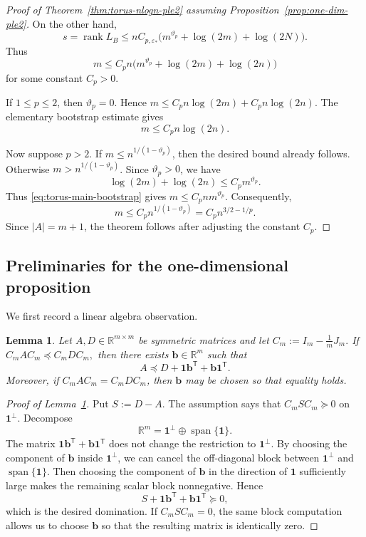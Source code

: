 \documentclass[11pt]{article}
\newtheorem{lemma}[theorem]{Lemma}
\theoremstyle{definition}
\newcommand{\R}{\mathbb R}
\begin{document}
\begin{proof}[Proof of Theorem~\ref{thm:torus-nlogn-ple2} assuming Proposition~\ref{prop:one-dim-ple2}]
On the other hand,
\[
s=\operatorname{rank}L_B
\le nC_{p,\varepsilon_*}\bigl(m^{\vartheta_p}+\log(2m)+\log(2N)\bigr).
\]
Thus
\begin{equation}\label{eq:torus-main-bootstrap}
m
\le
C_p n\bigl(m^{\vartheta_p}+\log(2m)+\log(2n)\bigr)
\end{equation}
for some constant \(C_{p}>0.\)

If \(1\le p\le2\), then \(\vartheta_p=0\). Hence
\(
m\le C_p n\log(2m)+C_p n\log(2n).
\)
The elementary bootstrap estimate
gives
\[
m\le C_p n\log(2n).
\]

Now suppose \(p>2\). If \(m\le n^{1/(1-\vartheta_p)}\), then the desired bound
already follows. Otherwise \(m>n^{1/(1-\vartheta_p)}\). Since \(\vartheta_p>0\),
we have
\[
\log(2m)+\log(2n)\le C_p m^{\vartheta_p}.
\]
Thus \eqref{eq:torus-main-bootstrap} gives
\(
m\le C_p n m^{\vartheta_p}.
\)
Consequently,
\[
m\le C_p n^{1/(1-\vartheta_p)}
=
C_p n^{3/2-1/p}.
\]
Since \(|A|=m+1\), the theorem follows after adjusting the constant \(C_p\).
\end{proof}

\subsection{Preliminaries for the one-dimensional proposition}



We first record a linear algebra observation.

\begin{lemma}\label{lem:centered-domination-to-domination}
Let \(A,D\in\R^{m\times m}\) be symmetric matrices and let
\(
C_m:=I_m-\frac1mJ_m.
\)
If
\(
C_mAC_m\preceq C_mDC_m,
\)
then there exists \(\boldsymbol{b}\in\R^m\) such that
\[
A\preceq D+\boldsymbol{1}\boldsymbol{b}^{\mathsf T}+\boldsymbol{b}\boldsymbol{1}^{\mathsf T}.
\]
Moreover, if \(C_mAC_m=C_mDC_m\), then \(\boldsymbol{b}\) may be chosen so that equality holds.
\end{lemma}

\begin{proof}[Proof of Lemma~\ref{lem:centered-domination-to-domination}]
Put \(S:=D-A\). The assumption says that \(C_mSC_m\succeq0\) on
\(\boldsymbol{1}^{\perp}\). Decompose
\[
\R^m=\boldsymbol{1}^{\perp}\oplus \operatorname{span}\{\boldsymbol{1}\}.
\]
The matrix \(\boldsymbol{1}\boldsymbol{b}^{\mathsf T}+\boldsymbol{b}\boldsymbol{1}^{\mathsf T}\) does not
change the restriction to \(\boldsymbol{1}^{\perp}\). By choosing the component
of \(\boldsymbol{b}\) inside \(\boldsymbol{1}^{\perp}\), we can cancel the off-diagonal block
between \(\boldsymbol{1}^{\perp}\) and \(\operatorname{span}\{\boldsymbol{1}\}\).
Then choosing the component of \(\boldsymbol{b}\) in the direction of \(\boldsymbol{1}\)
sufficiently large makes the remaining scalar block nonnegative. Hence
\[
S+\boldsymbol{1}\boldsymbol{b}^{\mathsf T}+\boldsymbol{b}\boldsymbol{1}^{\mathsf T}\succeq0,
\]
which is the desired domination. If \(C_mSC_m=0\), the same block computation
allows us to choose \(\boldsymbol{b}\) so that the resulting matrix is identically zero.
\end{proof}
\end{document}
